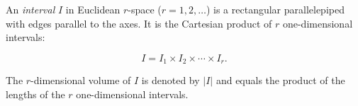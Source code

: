 An \textit{interval} $I$ in Euclidean $r$-space ($r = 1, 2, \ldots$) is a rectangular parallelepiped with edges parallel to the axes. It is the Cartesian product of $r$ one-dimensional intervals:

$$
I = I_1 \times I_2 \times \cdots \times I_r.
$$

The $r$-dimensional volume of $I$ is denoted by $|I|$ and equals the product of the lengths of the $r$ one-dimensional intervals.
